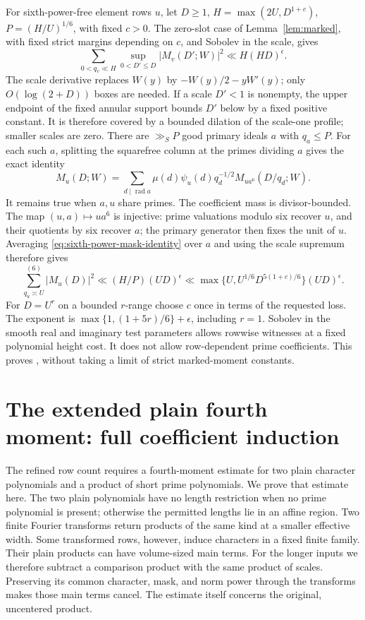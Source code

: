 \documentclass[12pt]{article}
\begin{document}
For sixth-power-free element rows \(u\), let \(D\ge1\),
\(H=\max(2U,D^{1+c})\), \(P=(H/U)^{1/6}\), with fixed \(c>0\).
The zero-slot case of Lemma~\ref{lem:marked}, with fixed strict margins depending
on \(c\), and Sobolev in the scale, gives
\[
 \sum_{0<q_v\ll H}\sup_{0<D'\le D}|M_v(D';W)|^2
                       \ll H(HD)^\epsilon .
\]
The scale derivative replaces \(W(y)\) by
\(-W(y)/2-yW'(y)\); only \(O(\log(2+D))\) boxes are needed.
If a scale \(D'<1\) is nonempty, the upper endpoint of the fixed
annular support bounds \(D'\) below by a fixed positive constant.
It is therefore covered by a bounded dilation of the scale-one
profile; smaller scales are zero.
There are \(\gg_S P\) good primary ideals \(a\) with \(q_a\le P\).
For each such \(a\), splitting the squarefree column at the
primes dividing \(a\) gives the exact identity
\[
 M_u(D;W)=\sum_{d\mid\operatorname{rad}a}
           \mu(d)\psi_u(d)q_d^{-1/2}M_{ua^6}(D/q_d;W).
 \tag{D17}\label{eq:sixth-power-mask-identity}
\]
It remains true when \(a,u\) share primes.
The coefficient mass is divisor-bounded.
The map \((u,a)\mapsto ua^6\) is injective: prime valuations
modulo six recover \(u\), and their quotients by six recover \(a\);
the primary generator then fixes the unit of \(u\).
Averaging \eqref{eq:sixth-power-mask-identity} over \(a\) and using the scale supremum therefore
gives
\[
 \sum_{q_u\asymp U}^{(6)}|M_u(D)|^2
        \ll (H/P)(UD)^\epsilon
        \ll \max\{U,U^{1/6}D^{5(1+c)/6}\}(UD)^\epsilon .
\]
For \(D=U^r\) on a bounded \(r\)-range choose \(c\) once in
terms of the requested loss.  The exponent is
\(\max\{1,(1+5r)/6\}+\epsilon\), including \(r=1\).
Sobolev in the smooth real and imaginary test parameters allows
rowwise witnesses at a fixed polynomial height cost.
It does not allow row-dependent prime coefficients.
This proves \cite[Lemma 17.6]{QRH}, without taking a limit of
strict marked-moment constants.

\section{The extended plain fourth moment: full coefficient induction}\label{app:plain}\label{sec:plain}

The refined row count requires a fourth-moment estimate for two plain
character polynomials and a product of short prime polynomials.  We prove
that estimate here.  The two plain polynomials have no length restriction
when no prime polynomial is present; otherwise the permitted lengths lie
in an affine region.  Two finite Fourier transforms return products of the
same kind at a smaller effective width.  Some transformed rows, however,
induce characters in a fixed
finite family.  Their plain products can have volume-sized main terms.
For the longer inputs we therefore subtract a comparison product with the
same product of scales.  Preserving its common character, mask, and norm
power through the transforms makes those main terms cancel.  The estimate
itself concerns the original, uncentered product.
\end{document}
